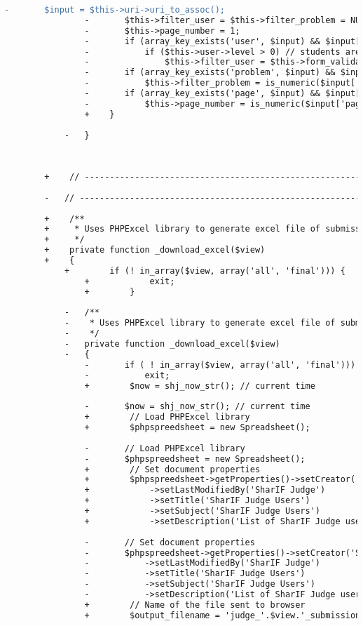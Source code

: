 \begin{lstlisting}[language=diff, caption=Perubahan pada kode Submissions.php]
				-		$input = $this->uri->uri_to_assoc();
				-		$this->filter_user = $this->filter_problem = NULL;
				-		$this->page_number = 1;
				-		if (array_key_exists('user', $input) && $input['user'])
				-			if ($this->user->level > 0) // students are not able to filter submissions by user
				-				$this->filter_user = $this->form_validation->alpha_numeric($input['user'])?$input['user']:NULL;
				-		if (array_key_exists('problem', $input) && $input['problem'])
				-			$this->filter_problem = is_numeric($input['problem'])?$input['problem']:NULL;
				-		if (array_key_exists('page', $input) && $input['page'])
				-			$this->page_number = is_numeric($input['page'])?$input['page']:1;
				+    }
			
			-	}
		
		
		
		+    // ------------------------------------------------------------------------
		
		-	// ------------------------------------------------------------------------
		
		+    /**
		+     * Uses PHPExcel library to generate excel file of submissions
		+     */
		+    private function _download_excel($view)
		+    {
			+        if (! in_array($view, array('all', 'final'))) {
				+            exit;
				+        }
			
			-	/**
			-	 * Uses PHPExcel library to generate excel file of submissions
			-	 */
			-	private function _download_excel($view)
			-	{
				-		if ( ! in_array($view, array('all', 'final')))
				-			exit;
				+        $now = shj_now_str(); // current time
				
				-		$now = shj_now_str(); // current time
				+        // Load PHPExcel library
				+        $phpspreedsheet = new Spreadsheet();
				
				-		// Load PHPExcel library
				-		$phpspreedsheet = new Spreadsheet();
				+        // Set document properties
				+        $phpspreedsheet->getProperties()->setCreator('SharIF Judge')
				+            ->setLastModifiedBy('SharIF Judge')
				+            ->setTitle('SharIF Judge Users')
				+            ->setSubject('SharIF Judge Users')
				+            ->setDescription('List of SharIF Judge users ('.$now.')');
				
				-		// Set document properties
				-		$phpspreedsheet->getProperties()->setCreator('SharIF Judge')
				-			->setLastModifiedBy('SharIF Judge')
				-			->setTitle('SharIF Judge Users')
				-			->setSubject('SharIF Judge Users')
				-			->setDescription('List of SharIF Judge users ('.$now.')');
				+        // Name of the file sent to browser
				+        $output_filename = 'judge_'.$view.'_submissions';
				

\end{lstlisting}
